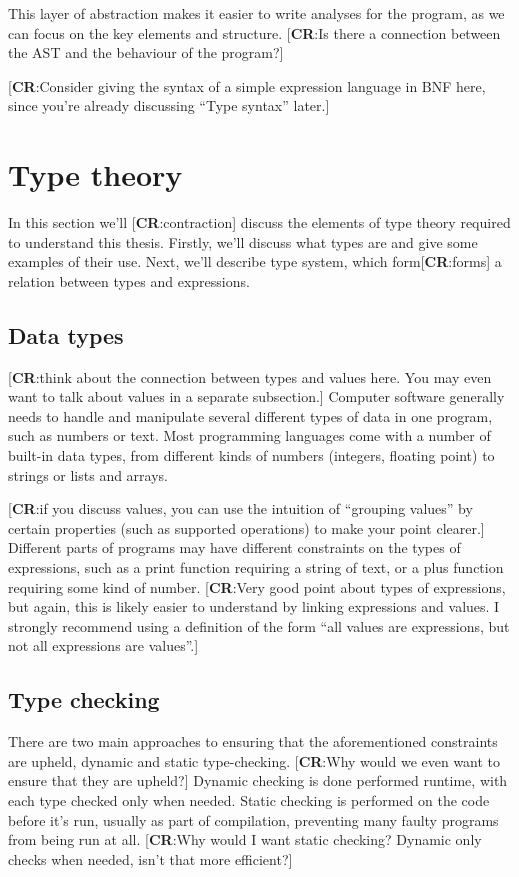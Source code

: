 \documentclass[nofilelist]{cslthse-msc}
\newcommand{\CR}[1]{\textcolor{green!60!black}{[\textbf{CR}:#1]}}
\begin{document}
This layer of abstraction makes it easier to write analyses for the program, as we can focus on the key elements and structure.
\CR{Is there a connection between the AST and the behaviour of the program?}

\CR{Consider giving the syntax of a simple expression language in BNF here, since you're already discussing ``Type syntax'' later.}

\section{Type theory}
In this section we'll \CR{contraction} discuss the elements of type theory required to understand this thesis.
Firstly, we'll discuss what types are and give some examples of their use.
Next, we'll describe type system, which form\CR{forms} a relation between types and expressions.

\subsection{Data types}
\CR{think about the connection between types and values here.  You may even want to talk about values in a separate subsection.}
Computer software generally needs to handle and manipulate several different types of data in one program, such as numbers or text.
Most programming languages come with a number of built-in data types, from different kinds of numbers (integers, floating point) to strings or lists and arrays.

\CR{if you discuss values, you can use the intuition of ``grouping values'' by certain properties (such as supported operations) to make your point clearer.}
Different parts of programs may have different constraints on the types of expressions, such as a print function requiring a string of text, or a plus function requiring some kind of number.
\CR{Very good point about types of expressions, but again, this is likely easier to understand by linking expressions and values.
  I strongly recommend using a definition of the form ``all values are expressions, but not all expressions are values''.}

\subsection{Type checking}
There are two main approaches to ensuring that the aforementioned constraints are upheld, dynamic and static type-checking.
\CR{Why would we even want to ensure that they are upheld?}
Dynamic checking is done performed runtime, with each type checked only when needed.
Static checking is performed on the code before it's run, usually as part of compilation, preventing many faulty programs from being run at all.
\CR{Why would I want static checking?  Dynamic only checks when needed, isn't that more efficient?}
\end{document}
